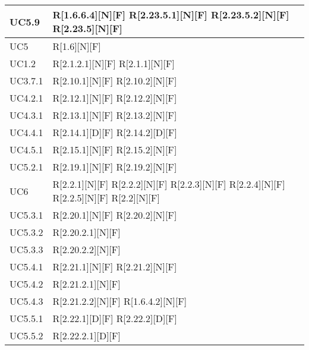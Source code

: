 \begin{longtable}{X | X}
\hline
UC5.9 & R[1.6.6.4][N][F] \newline
R[2.23.5.1][N][F] \newline
R[2.23.5.2][N][F] \newline
R[2.23.5][N][F]  \\
\hline
UC5 & R[1.6][N][F]  \\
\hline
UC1.2 & R[2.1.2.1][N][F] \newline
R[2.1.1][N][F]  \\
\hline
UC3.7.1 & R[2.10.1][N][F] \newline
R[2.10.2][N][F]  \\
\hline
UC4.2.1 & R[2.12.1][N][F] \newline
R[2.12.2][N][F]  \\
\hline
UC4.3.1 & R[2.13.1][N][F] \newline
R[2.13.2][N][F]  \\
\hline
UC4.4.1 & R[2.14.1][D][F] \newline
R[2.14.2][D][F]  \\
\hline
UC4.5.1 & R[2.15.1][N][F] \newline
R[2.15.2][N][F]  \\
\hline
UC5.2.1 & R[2.19.1][N][F] \newline
R[2.19.2][N][F]  \\
\hline
UC6 & R[2.2.1][N][F] \newline
R[2.2.2][N][F] \newline
R[2.2.3][N][F] \newline
R[2.2.4][N][F] \newline
R[2.2.5][N][F] \newline
R[2.2][N][F]  \\
\hline
UC5.3.1 & R[2.20.1][N][F] \newline
R[2.20.2][N][F]  \\
\hline
UC5.3.2 & R[2.20.2.1][N][F]  \\
\hline
UC5.3.3 & R[2.20.2.2][N][F]  \\
\hline
UC5.4.1 & R[2.21.1][N][F] \newline
R[2.21.2][N][F]  \\
\hline
UC5.4.2 & R[2.21.2.1][N][F]  \\
\hline
UC5.4.3 & R[2.21.2.2][N][F] \newline
R[1.6.4.2][N][F]  \\
\hline
UC5.5.1 & R[2.22.1][D][F] \newline
R[2.22.2][D][F]  \\
\hline
UC5.5.2 & R[2.22.2.1][D][F]  \\

\end{longtable}
